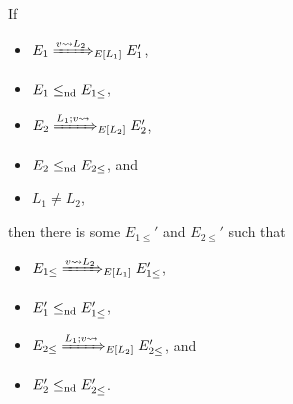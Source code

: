 \begin{lem}
\label{lem:send-control-lifting}
If
\begin{itemize}
  \item $E_1 \ctrlsteploc[v \sendsto L_2]{L_1} E_1'$,
  \item $E_1 \leq_{\text{nd}} E_{1 \leq}$,
  \item $E_2 \ctrlsteploc[L_1;v \sendsto]{L_2} E_2'$,
  \item $E_2 \leq_{\text{nd}} E_{2 \leq}$, and
  \item $L_1 \neq L_2$,
\end{itemize}
then there is some $E_{1 \leq}'$ and $E_{2 \leq}'$ such that
\begin{itemize}
  \item $E_{1 \leq} \ctrlsteploc[v \sendsto L_2]{L_1} E_{1 \leq}'$,
  \item $E_1' \leq_{\text{nd}} E_{1 \leq}'$,
  \item $E_{2 \leq} \ctrlsteploc[L_1;v \sendsto]{L_2} E_{2 \leq}'$, and
  \item $E_2' \leq_{\text{nd}} E_{2 \leq}'$.
\end{itemize}
\end{lem}


